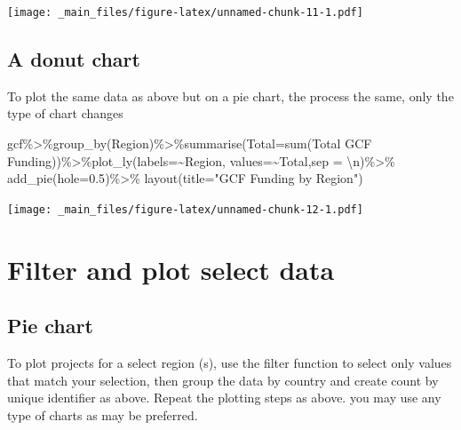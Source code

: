 \documentclass[
]{book}
\newenvironment{Shaded}{\begin{snugshade}}{\end{snugshade}}
\newcommand{\AttributeTok}[1]{\textcolor[rgb]{0.77,0.63,0.00}{#1}}
\newcommand{\FloatTok}[1]{\textcolor[rgb]{0.00,0.00,0.81}{#1}}
\newcommand{\FunctionTok}[1]{\textcolor[rgb]{0.00,0.00,0.00}{#1}}
\newcommand{\NormalTok}[1]{#1}
\newcommand{\OtherTok}[1]{\textcolor[rgb]{0.56,0.35,0.01}{#1}}
\newcommand{\SpecialCharTok}[1]{\textcolor[rgb]{0.00,0.00,0.00}{#1}}
\newcommand{\StringTok}[1]{\textcolor[rgb]{0.31,0.60,0.02}{#1}}
\begin{document}
\texttt{[image: \_main\_files/figure-latex/unnamed-chunk-11-1.pdf]}

\hypertarget{a-donut-chart}{%
\subsection{A donut chart}\label{a-donut-chart}}

To plot the same data as above but on a pie chart, the process the same, only the type of chart changes

\begin{Shaded}
\begin{Highlighting}[]
\NormalTok{gcf}\SpecialCharTok{\%\textgreater{}\%}\FunctionTok{group\_by}\NormalTok{(Region)}\SpecialCharTok{\%\textgreater{}\%}\FunctionTok{summarise}\NormalTok{(}\StringTok{\textquotesingle{}Total\textquotesingle{}}\OtherTok{=}\FunctionTok{sum}\NormalTok{(}\StringTok{\textasciigrave{}}\AttributeTok{Total GCF Funding}\StringTok{\textasciigrave{}}\NormalTok{))}\SpecialCharTok{\%\textgreater{}\%}\FunctionTok{plot\_ly}\NormalTok{(}\AttributeTok{labels=}\SpecialCharTok{\textasciitilde{}}\NormalTok{Region, }\AttributeTok{values=}\SpecialCharTok{\textasciitilde{}}\NormalTok{Total,}\AttributeTok{sep =} \StringTok{\textquotesingle{}}\SpecialCharTok{\textbackslash{}n}\StringTok{\textquotesingle{}}\NormalTok{)}\SpecialCharTok{\%\textgreater{}\%} \FunctionTok{add\_pie}\NormalTok{(}\AttributeTok{hole=}\FloatTok{0.5}\NormalTok{)}\SpecialCharTok{\%\textgreater{}\%}
    \FunctionTok{layout}\NormalTok{(}\AttributeTok{title=}\StringTok{"GCF Funding by Region"}\NormalTok{)}
\end{Highlighting}
\end{Shaded}

\texttt{[image: \_main\_files/figure-latex/unnamed-chunk-12-1.pdf]}

\hypertarget{filter-and-plot-select-data}{%
\section{Filter and plot select data}\label{filter-and-plot-select-data}}

\hypertarget{pie-chart}{%
\subsection{Pie chart}\label{pie-chart}}

To plot projects for a select region (s), use the filter function to select only values that match your selection, then group the data by country and create count by unique identifier as above. Repeat the plotting steps as above. you may use any type of charts as may be preferred.
\end{document}
